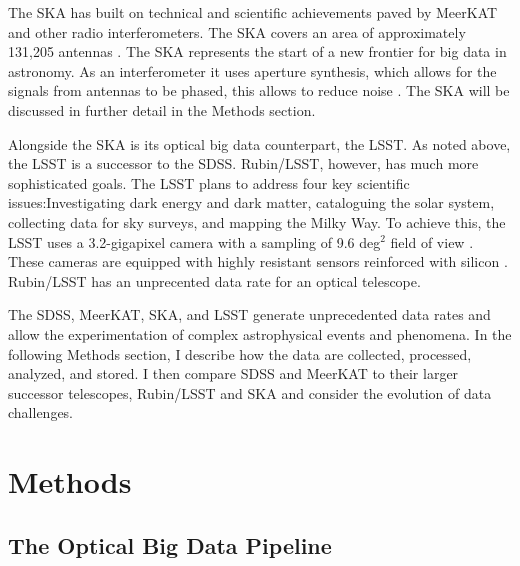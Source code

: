 \documentclass[preprint,linenumbers, longauthor]{aastex631}
\begin{document}
The SKA has built on technical and scientific achievements paved by MeerKAT and other radio interferometers.
The SKA covers an area of approximately 131,205 antennas \citep{SKATelescopeSpecifications}. The SKA represents the start of a new frontier for big data in astronomy.
As an interferometer it uses aperture synthesis, which allows for the signals from antennas to be phased, this allows to reduce noise \citep{dewdneySquareKilometreArray2009}. The SKA will be discussed in further detail in the Methods section. 

Alongside the SKA is its optical big data counterpart, the LSST.
As noted above, the LSST is a successor to the SDSS. Rubin/LSST, however, has much more sophisticated goals. The LSST plans to address four key scientific issues:Investigating dark energy and dark matter, cataloguing the solar system, collecting data for sky surveys, and mapping the Milky Way.
To achieve this, the LSST uses a 3.2-gigapixel camera with a sampling of 9.6 deg$^2$ field of view \citep{ivezicLSSTScienceDrivers2019}. These cameras are equipped with highly resistant sensors reinforced with silicon \citep{ivezicLSSTScienceDrivers2019}. Rubin/LSST has an unprecented data rate for an optical telescope.

The SDSS, MeerKAT, SKA, and LSST generate unprecedented data rates and allow the experimentation of complex astrophysical events and phenomena.
In the following Methods section, I describe how the data are collected, processed, analyzed, and stored. I then compare SDSS and MeerKAT to their larger successor telescopes, Rubin/LSST and SKA and consider the evolution of data challenges.

\section{Methods}


\subsection{The Optical Big Data Pipeline}
\end{document}
